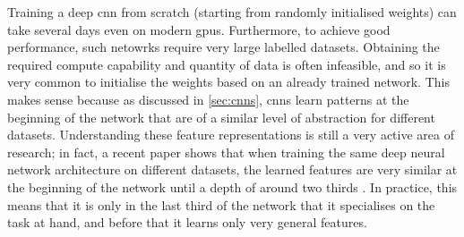 \documentclass[../report.tex]{subfiles}
\begin{document}
Training a deep \gls{cnn} from scratch (starting from randomly initialised weights) can take several days even on modern \glspl{gpu}. 
Furthermore, to achieve good performance, such netowrks require very large labelled datasets.
Obtaining the required compute capability and quantity of data is often infeasible, and so it is very common to initialise the weights based on an already trained network.
This makes sense because as discussed in \cref{sec:cnns}, \glspl{cnn} learn patterns at the beginning of the network that are of a similar level of abstraction for different datasets.
Understanding these feature representations is still a very active area of research; in fact, a recent paper shows that when training the same deep neural network architecture on different datasets, the learned features are very similar at the beginning of the network until a depth of around two thirds \cite{kornblith2019}.
In practice, this means that it is only in the last third of the network that it specialises on the task at hand, and before that it learns only very general features.
\end{document}
